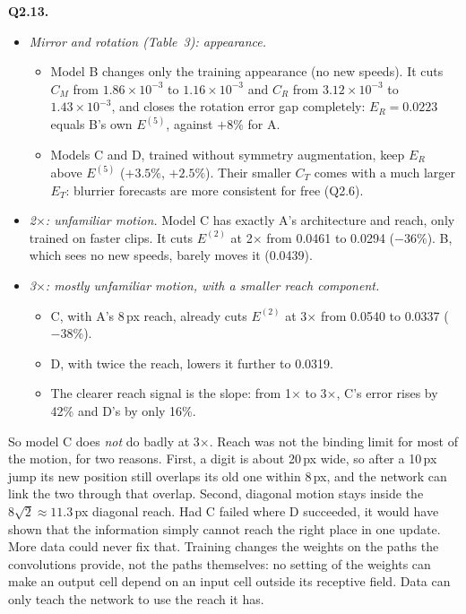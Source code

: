 \textbf{Q2.13.}
\begin{itemize}
\item \emph{Mirror and rotation (Table~3): appearance.}
  \begin{itemize}
  \item Model B changes only the training appearance (no new speeds). It cuts $C_M$ from $1.86\times10^{-3}$ to
  $1.16\times10^{-3}$ and $C_R$ from $3.12\times10^{-3}$ to $1.43\times10^{-3}$, and closes the rotation error gap
  completely: $E_R=0.0223$ equals B's own $E^{(5)}$, against $+8\%$ for A.
  \item Models C and D, trained without symmetry augmentation, keep $E_R$ above $E^{(5)}$ ($+3.5\%$, $+2.5\%$).
  Their smaller $C_T$ comes with a much larger $E_T$: blurrier forecasts are more consistent for free (Q2.6).
  \end{itemize}
\item \emph{2$\times$: unfamiliar motion.} Model C has exactly A's architecture and reach, only trained on faster
clips. It cuts $E^{(2)}$ at 2$\times$ from 0.0461 to 0.0294 ($-36\%$). B, which sees no new speeds, barely moves it
(0.0439).
\item \emph{3$\times$: mostly unfamiliar motion, with a smaller reach component.}
  \begin{itemize}
  \item C, with A's 8\,px reach, already cuts $E^{(2)}$ at 3$\times$ from 0.0540 to 0.0337 ($-38\%$).
  \item D, with twice the reach, lowers it further to 0.0319.
  \item The clearer reach signal is the slope: from 1$\times$ to 3$\times$, C's error rises by 42\% and D's by
  only 16\%.
  \end{itemize}
\end{itemize}

So model C does \emph{not} do badly at 3$\times$. Reach was not the binding limit for most of the motion, for two
reasons. First, a digit is about 20\,px wide, so after a 10\,px jump its new position still overlaps its old one
within 8\,px, and the network can link the two through that overlap. Second, diagonal motion stays inside the
$8\sqrt2\approx11.3$\,px diagonal reach. Had C failed where D succeeded, it would have shown that the information
simply cannot reach the right place in one update. More data could never fix that. Training changes the weights on
the paths the convolutions provide, not the paths themselves: no setting of the weights can make an output cell
depend on an input cell outside its receptive field. Data can only teach the network to use the reach it has.

